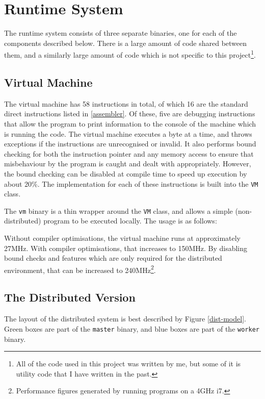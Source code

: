 \section{Runtime System}

The runtime system consists of three separate binaries, one for each of the
components described below. There is a large amount of code shared between them,
and a similarly large amount of code which is not specific to this
project\footnote{All of the code used in this project was written by me, but
some of it is utility code that I have written in the past.}.

\subsection{Virtual Machine}

The virtual machine has 58 instructions in total, of which 16 are the standard
direct instructions listed in \ref{assembler}. Of these, five are debugging
instructions that allow the program to print information to the console of the
machine which is running the code. The virtual machine executes a byte at
a time, and throws exceptions if the instructions are unrecognised or invalid.
It also performs bound checking for both the instruction pointer and any memory
access to ensure that misbehaviour by the program is caught and dealt with
appropriately. However, the bound checking can be disabled at compile time to
speed up execution by about 20\%. The implementation for each of these
instructions is built into the \texttt{VM} class.

The \texttt{vm} binary is a thin wrapper around the \texttt{VM} class, and
allows a simple (non-distributed) program to be executed locally. The usage is
as follows:


Without compiler optimisations, the virtual machine runs at approximately 27MHz.
With compiler optimisations, that increases to 150MHz. By disabling bound checks
and features which are only required for the distributed environment, that can
be increased to 240MHz\footnote{Performance figures generated by running
programs on a 4GHz i7.}.

\subsection{The Distributed Version}

The layout of the distributed system is best described by Figure
\ref{dist-model}. Green boxes are part of the \texttt{master} binary, and
blue boxes are part of the \texttt{worker} binary.

